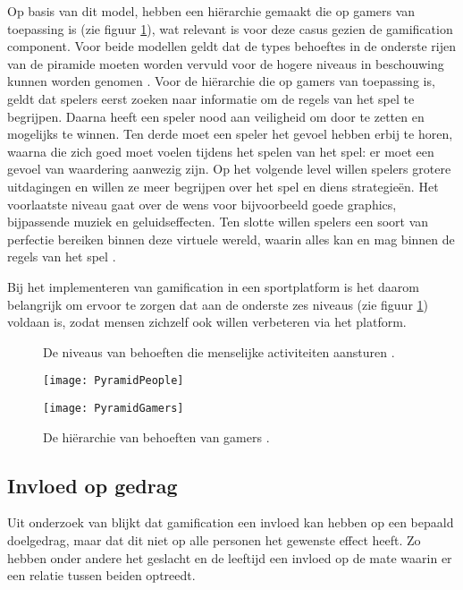 Op basis van dit model, hebben \textcite{Siang2003} een hiërarchie gemaakt die op gamers van toepassing is (zie figuur \ref{fig:gamers-hierarchy}), wat relevant is voor deze casus gezien de gamification component.
Voor beide modellen geldt dat de types behoeftes in de onderste rijen van de piramide moeten worden vervuld voor de hogere niveaus in beschouwing kunnen worden genomen \autocite{Richter2014}.
Voor de hiërarchie die op gamers van toepassing is, geldt dat spelers eerst zoeken naar informatie om de regels van het spel te begrijpen. Daarna heeft een speler nood aan veiligheid om door te zetten en mogelijks te winnen. Ten derde moet een speler het gevoel hebben erbij te horen, waarna die zich goed moet voelen tijdens het spelen van het spel: er moet een gevoel van waardering aanwezig zijn. Op het volgende level willen spelers grotere uitdagingen en willen ze meer begrijpen over het spel en diens strategieën. Het voorlaatste niveau gaat over de wens voor bijvoorbeeld goede graphics, bijpassende muziek en geluidseffecten. Ten slotte willen spelers een soort van perfectie bereiken binnen deze virtuele wereld, waarin alles kan en mag binnen de regels van het spel \autocite{Greitzer2007, Siang2003}.

Bij het implementeren van gamification in een sportplatform is het daarom belangrijk om ervoor te zorgen dat aan de onderste zes niveaus (zie figuur \ref{fig:gamers-hierarchy}) voldaan is, zodat mensen zichzelf ook willen verbeteren via het platform.

\begin{figure}[htbp]
    \begin{minipage}[t]{0.48\linewidth} %
        \centering
        \caption[Behoeften-hiërarchie algemeen]{De  niveaus van behoeften die menselijke activiteiten aansturen \autocite{Lilienfeld2014}.}
        \texttt{[image: PyramidPeople]}
        \label{fig:people-hierarchy}
    \end{minipage}
    \hfill
    \begin{minipage}[t]{0.48\linewidth} %
        \centering
        \caption[Behoeften-hiërarchie gamers]{De hiërarchie van behoeften van gamers \autocite{Richter2014}.}
        \texttt{[image: PyramidGamers]}
        \label{fig:gamers-hierarchy}
    \end{minipage}
\end{figure}

\subsection{Invloed op gedrag}
Uit onderzoek van \textcite{Hamari2013a} blijkt dat gamification een invloed kan hebben op een bepaald doelgedrag, maar dat dit niet op alle personen het gewenste effect heeft. Zo hebben onder andere het geslacht en de leeftijd een invloed op de mate waarin er een relatie tussen beiden optreedt.

